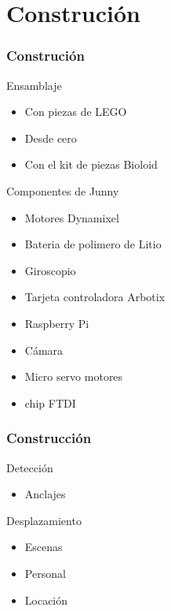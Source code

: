 \documentclass{beamer}
\begin{document}
  

\section{Construci\'on }
\begin{frame}
  \frametitle{Construci\'on}


\begin{block}{Ensamblaje}
	\begin{itemize}
		\item Con piezas de LEGO
		\item Desde cero
		\item Con el kit de piezas Bioloid
	\end{itemize}
\end{block}

 
\end{frame}

\begin{frame}
\begin{block}{Componentes de Junny}
\begin{itemize}
\item Motores Dynamixel
\item Bateria de polimero de Litio
\item Giroscopio 
\item Tarjeta controladora Arbotix
\item Raspberry Pi
\item C\'amara
\item Micro servo motores 
\item chip FTDI
\end{itemize}
\end{block}
\end{frame}

\begin{frame}
\frametitle{Construcci\'on}
\begin{block}{Detecci\'on}
	\begin{itemize}
		\item Anclajes
		
	\end{itemize}
\end{block}

\begin{block}{Desplazamiento}
	\begin{itemize}
	\item Escenas
	\item Personal
	\item Locaci\'{o}n
\end{itemize}		
\end{block}
\end{frame}
\end{document}
